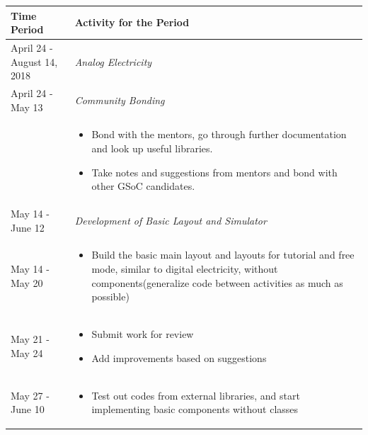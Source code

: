 \documentclass[preprint,12pt]{elsarticle}
\begin{document}
\begin{center}
\setlength{\extrarowheight}{1.75pt}
\begin{tabularx}{\linewidth}{|l|X|}
\hline

\textbf{Time Period} & \textbf{Activity for the Period}\\
\hline

{April 24 - August 14, 2018} & {\textit{Analog Electricity}}\\
\hline

{April 24 - May 13} & {\textit{Community Bonding}}\\
\hline

 & \par
\parbox{12cm}{
\begin{itemize}[noitemsep, topsep=2pt]
	\item Bond with the mentors, go through further documentation and look up useful libraries.
	\item Take notes and suggestions from mentors and bond with other GSoC candidates.
\end{itemize}
}\\
\hline\hline

{May 14 - June 12} & {\textit{Development of Basic Layout and Simulator}}\\
\hline

{May 14 - May 20} & \par
\parbox{12cm}{
\begin{itemize}[noitemsep, topsep=2pt]
	\item Build the basic main layout and layouts for tutorial and free mode, similar to digital electricity, without components(generalize code between activities as much as possible)
\end{itemize}
}\\
\hline

{May 21 - May 24} & \par
\parbox{12cm}{
\begin{itemize}[noitemsep, topsep=2pt]
	\item Submit work for review
	\item Add improvements based on suggestions
\end{itemize}
}\\
\hline

{May 27 - June 10} & \par
\parbox{12cm}{
\begin{itemize}[noitemsep, topsep=2pt]
	\item Test out codes from external libraries, and start implementing basic components without classes


\end{itemize}}
\end{tabularx}
\end{center}
\end{document}
